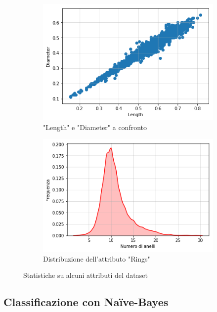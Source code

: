 \documentclass[a4paper]{article}
\begin{document}
\begin{figure}[h]
\centering
\begin{subfigure}[b]{.48\linewidth}
\includegraphics[width=\linewidth]{images/corr.png}
\caption{"Length" e "Diameter" a confronto}
	\label{fig:corr}
\end{subfigure}
\begin{subfigure}[b]{.48\linewidth}
\includegraphics[width=\linewidth]{images/kde_rings.png}
\caption{Distribuzione dell'attributo "Rings"}	
\label{fig:KDE_Rings}
\end{subfigure}
\caption{Statistiche su alcuni attributi del dataset}
\label{fig:abalone_stats}
\end{figure}

\subsection{Classificazione con Naïve-Bayes}
\end{document}
